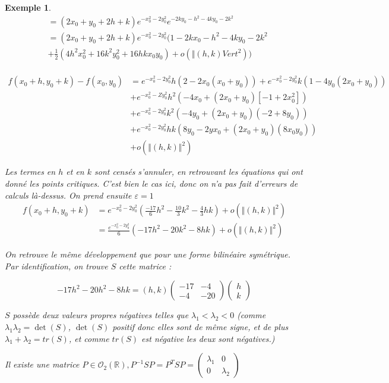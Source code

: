 \documentclass[a4paper,12pt]{book}
\newtheorem{Exe}{Exemple}[section]
\def\R{\mathbb{R}}
\begin{document}
\begin{Exe}
\begin{align*}
&= (2x_0+y_0+2h+k)e^{-x_0^2-2y_0^2}e^{-2ky_0-h^2-4ky_0-2k^2}\\
&=(2x_0+y_0+2h+k)e^{-x_0^2-2y_0^2}(1-2kx_0-h^2-4ky_0-2k^2\\
&+\frac{1}{2}(4h^2x_0^2+16k^2y_0^2+16hkx_0y_0)+o(\Vert(h,k)Vert^2))
\end{align*}
\\\begin{align*}f(x_0+h, y_0+k)-f(x_0, y_0) &= e^{-x_0^2-2y_0^2}h(2-2x_0(x_0+y_0))+ e^{-x_0^2-2y_0^2}k(1-4y_0(2x_0+y_0))\\
&+ e^{-x_0^2-Zy_0^2}h^2(-4x_0+(2x_0+y_0)[-1+2x_0^2])\\
&+ e^{-x_0^2-2y_0^2}k^2(-4y_0+(2x_0+y_0)(-2+8y_0))\\
&+e^{-x_0^2-2y_0^2}hk(8y_0-2yx_0+(2x_0+y_0)(8x_0y_0))\\
&+ o(\Vert (h,k)\Vert^2)
\end{align*}
\par Les termes en $h$ et en $k$ sont censés s'annuler, en retrouvant les équations qui ont donné les points critiques. C'est bien le cas ici, donc on n'a pas fait d'erreurs de calculs là-dessus. On prend ensuite $\varepsilon=1$
\\\begin{align*} f(x_0+h, y_0+k) &=e^{-x_0^2-2y_0^2}(\frac{-17}{6}h^2-\frac{10}{3}k^2 -\frac{4}{3}hk)+o(\Vert (h,k)\Vert^2)\\
&= \frac{e^{-x_0^2-2y_0^2}}{6}(-17h^2-20k^2-8hk)+o(\Vert (h, k)\Vert^2)
\end{align*}
\par On retrouve le même développement que pour une forme bilinéaire symétrique. Par identification, on trouve $S$ cette matrice :
\par $$-17h^2-20h^2-8hk = (h,k)\begin{pmatrix}-17 &-4 \\ -4& -20\end{pmatrix}\begin{pmatrix} h \\ k\end{pmatrix}$$
\par $S$ possède deux valeurs propres négatives telles que $\lambda_1<\lambda_2<0$ (comme $\lambda_1\lambda_2 = \det(S)$, $\det(S)$ positif donc elles sont de même signe, et de plus $\lambda_1+\lambda_2=tr(S)$, et comme $tr(S)$ est négative les deux sont négatives.)
\par Il existe une matrice $P\in\mathcal{O}_2(\R), P^{-1}SP = P^TSP = \begin{pmatrix}\lambda_1 & 0 \\ 0 & \lambda_2\end{pmatrix}$

\end{Exe}
\end{document}
